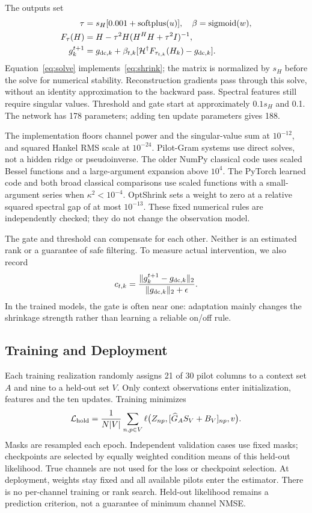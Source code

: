 \documentclass[10pt,journal,letterpaper]{IEEEtran}
\newcommand{\HH}{\mathcal{H}}
\DeclareMathOperator{\sigmoid}{sigmoid}
\DeclareMathOperator{\softplus}{softplus}
\begin{document}
The outputs set
\begin{align}
 \tau&=s_H[0.001+\softplus(u)],\quad \beta=\sigmoid(w),\\
 F_\tau(H)&=H-\tau^2H(H^HH+\tau^2I)^{-1},\label{eq:solve}\\
 g_k^{t+1}&=g_{{\rm dc},k}+\beta_{t,k}
       [\HH^\dagger F_{\tau_{t,k}}(H_k)-g_{{\rm dc},k}].
\end{align}
Equation~\eqref{eq:solve} implements~\eqref{eq:shrink}; the matrix is normalized by $s_H$ before the solve for numerical stability. Reconstruction gradients pass through this solve, without an identity approximation to the backward pass. Spectral features still require singular values. Threshold and gate start at approximately $0.1s_H$ and 0.1. The network has 178 parameters; adding ten update parameters gives 188.

The implementation floors channel power and the singular-value sum at $10^{-12}$, and squared Hankel RMS scale at $10^{-24}$. Pilot-Gram systems use direct solves, not a hidden ridge or pseudoinverse. The older NumPy classical code uses scaled Bessel functions and a large-argument expansion above $10^4$. The PyTorch learned code and both broad classical comparisons use scaled functions with a small-argument series when $\kappa^2<10^{-4}$. OptShrink sets a weight to zero at a relative squared spectral gap of at most $10^{-13}$. These fixed numerical rules are independently checked; they do not change the observation model.

The gate and threshold can compensate for each other. Neither is an estimated rank or a guarantee of safe filtering. To measure actual intervention, we also record
\begin{equation}
 c_{t,k}=\frac{\|g_k^{t+1}-g_{{\rm dc},k}\|_2}{\|g_{{\rm dc},k}\|_2+\epsilon}.
\end{equation}
In the trained models, the gate is often near one: adaptation mainly changes the shrinkage strength rather than learning a reliable on/off rule.

\subsection{Training and Deployment}
Each training realization randomly assigns 21 of 30 pilot columns to a context set $A$ and nine to a held-out set $V$. Only context observations enter initialization, features and the ten updates. Training minimizes
\begin{equation}
 \mathcal L_{\rm hold}=\frac{1}{N|V|}\sum_{n,p\in V}
 \ell\big(Z_{np},[\widehat G_A S_V+B_V]_{np},v\big).
\end{equation}
Masks are resampled each epoch. Independent validation cases use fixed masks; checkpoints are selected by equally weighted condition means of this held-out likelihood. True channels are not used for the loss or checkpoint selection. At deployment, weights stay fixed and all available pilots enter the estimator. There is no per-channel training or rank search. Held-out likelihood remains a prediction criterion, not a guarantee of minimum channel NMSE.
\end{document}

